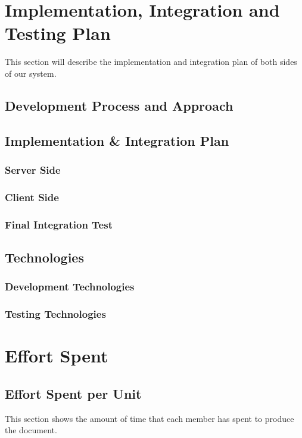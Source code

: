 \documentclass[a4paper,12pt]{article}
\begin{document}
\section{Implementation, Integration and Testing Plan}
This section will describe the implementation and integration plan of both sides of our system.
\subsection{Development Process and Approach}
\subsection{Implementation \& Integration Plan}
\subsubsection{Server Side}
\subsubsection{Client Side}
\subsubsection{Final Integration Test}
\subsection{Technologies}
\subsubsection{Development Technologies}
\subsubsection{Testing Technologies}
\newpage

\section{Effort Spent}
\subsection{Effort Spent per Unit}
This section shows the amount of time that each member has spent to produce the document. 
\end{document}
